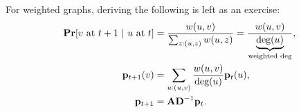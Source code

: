 \documentclass[11pt]{article}
\begin{document}
For weighted graphs, deriving the following is left as an exercise:
\begin{align*}
\pr[\text{$v$ at $t+1$ $|$ $u$ at $t$}] &= \dfrac{w(u,v)}{\sum_{z:(u,z)}w(u,z)} = \dfrac{w(u,v)}{\underbrace{\text{deg}(u)}_{\footnotesize\text{weighted deg}}}, \\
\V{p}_{t+1}(v) &= \sum_{u:(u,v)} \dfrac{w(u,v)}{\text{deg}(u)}\V{p}_t(u), \\
\V{p}_{t+1} &= \V{A}\V{D}^{-1}\V{p}_t.
\end{align*}
\end{document}
